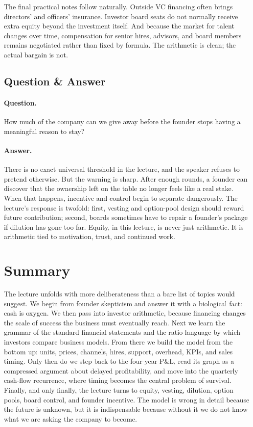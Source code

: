The final practical notes follow naturally. Outside VC financing often brings directors' and officers' insurance. Investor board seats do not normally receive extra equity beyond the investment itself. And because the market for talent changes over time, compensation for senior hires, advisors, and board members remains negotiated rather than fixed by formula. The arithmetic is clean; the actual bargain is not.

\subsection{Question \& Answer}

\paragraph{Question.}
How much of the company can we give away before the founder stops having a meaningful reason to stay?

\paragraph{Answer.}
There is no exact universal threshold in the lecture, and the speaker refuses to pretend otherwise. But the warning is sharp. After enough rounds, a founder can discover that the ownership left on the table no longer feels like a real stake. When that happens, incentive and control begin to separate dangerously. The lecture's response is twofold: first, vesting and option-pool design should reward future contribution; second, boards sometimes have to repair a founder's package if dilution has gone too far. Equity, in this lecture, is never just arithmetic. It is arithmetic tied to motivation, trust, and continued work.

\section{Summary}

The lecture unfolds with more deliberateness than a bare list of topics would suggest. We begin from founder skepticism and answer it with a biological fact: cash is oxygen. We then pass into investor arithmetic, because financing changes the scale of success the business must eventually reach. Next we learn the grammar of the standard financial statements and the ratio language by which investors compare business models. From there we build the model from the bottom up: units, prices, channels, hires, support, overhead, KPIs, and sales timing. Only then do we step back to the four-year P\&L, read its graph as a compressed argument about delayed profitability, and move into the quarterly cash-flow recurrence, where timing becomes the central problem of survival. Finally, and only finally, the lecture turns to equity, vesting, dilution, option pools, board control, and founder incentive. The model is wrong in detail because the future is unknown, but it is indispensable because without it we do not know what we are asking the company to become.